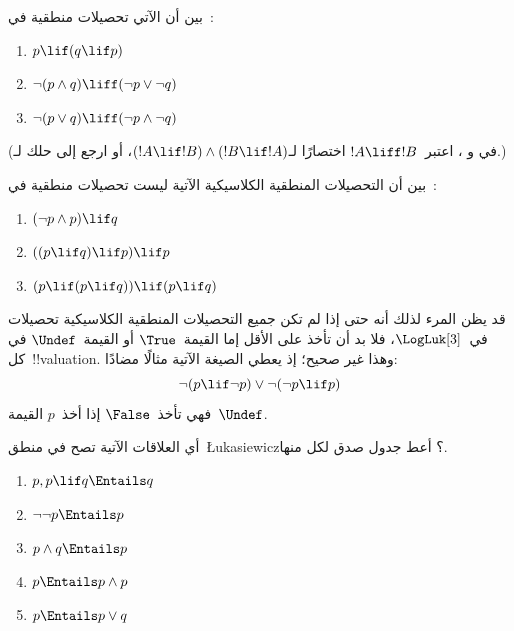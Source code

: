 \documentclass[../../../include/open-logic-section]{subfiles}
\begin{document}
\begin{prob}
  بين أن الآتي تحصيلات منطقية في~\LogLuk[3]:
  \begin{enumerate}
    \item $p \lif (q \lif p)$
    \item\label{mvl:thr:luk:prob:luk-taut-2} $\lnot(p \land q) \liff (\lnot p \lor \lnot q)$
    \item\label{mvl:thr:luk:prob:luk-taut-3} $\lnot(p \lor q) \liff (\lnot p \land \lnot q)$
  \end{enumerate}
  (في  و
  ، اعتبر~$!A \liff !B$
  اختصارًا لـ$(!A \lif !B) \land (!B \lif !A)$، أو ارجع إلى حلك
  لـ.)
\end{prob}

\begin{prob}
  بين أن التحصيلات المنطقية الكلاسيكية الآتية ليست تحصيلات منطقية
  في~\LogLuk[3]:
  \begin{enumerate}
    \item $(\lnot p \land p) \lif q$
    \item $((p \lif q) \lif p) \lif p$
    \item $(p \lif (p \lif q)) \lif (p \lif q)$
  \end{enumerate}
\end{prob}

قد يظن المرء لذلك أنه حتى إذا لم تكن جميع التحصيلات المنطقية
الكلاسيكية تحصيلات في~$\LogLuk[3]$، فلا بد أن تأخذ على الأقل إما
القيمة~$\True$ أو القيمة~$\Undef$ في كل~!!{valuation}. وهذا غير صحيح؛
إذ يعطي الصيغة الآتية مثالًا مضادًا:
\[
  \lnot(p \lif \lnot p) \lor \lnot(\lnot p \lif p)
\]
فهي تأخذ~$\False$ إذا أخذ~$p$ القيمة~$\Undef$.

\begin{prob}
  أي العلاقات الآتية تصح في منطق~\L ukasiewicz؟ أعط جدول صدق لكل منها.
  \begin{enumerate}
    \item $p, p \lif q \Entails q$
    \item $\lnot\lnot p \Entails p$
    \item $p \land q \Entails p$
    \item $p \Entails p \land p$
    \item $p \Entails p \lor q$
  \end{enumerate}
\end{prob}
\end{document}
